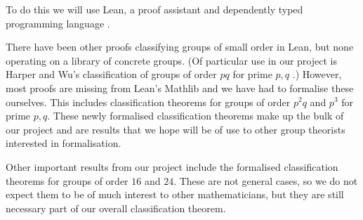 To do this we will use Lean, a proof assistant and dependently typed programming language \cite{noauthor_lean_nodate}.

There have been other proofs classifying groups of small order in Lean, but none operating
on a library of concrete groups.
(Of particular use in our project is Harper and Wu's classification of groups of order \(pq\)
for prime \(p, q\) \cite{harper_classifying_2025}.)
However, most proofs are missing from Lean's Mathlib \cite{noauthor_mathlib4_nodate}
and we have had to formalise these ourselves.
This includes classification theorems for groups of order \(p^2q\) and \(p^3\) for prime \(p, q\).
These newly formalised classification theorems make up the bulk of our project and are results
that we hope will be of use to other group theorists interested in formalisation.

Other important results from our project include the formalised classification theorems
for groups of order \(16\) and \(24\).
These are not general cases, so we do not expect them to be of much interest to other mathematicians,
but they are still necessary part of our overall classification theorem. 

